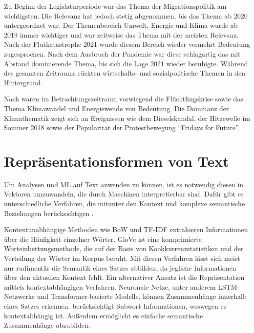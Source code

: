 Zu Beginn der Legislaturperiode war das Thema der Migrationspolitik am wichtigsten. Die Relevanz hat jedoch stetig abgenommen, bis das Thema ab \num{2020} untergeordnet war. Der Themenbereich Umwelt, Energie und Klima wurde ab \num{2019} immer wichtiger und war zeitweise das Thema mit der meisten Relevanz. Nach der Flutkatastrophe \num{2021} wurde diesem Bereich wieder vermehrt Bedeutung zugesprochen. Nach dem Ausbruch der Pandemie war diese schlagartig das mit Abstand dominierende Thema, bis sich die Lage \num{2021} wieder beruhigte. Während des gesamten Zeitraums rückten wirtschafts- und sozialpolitische Themen in den Hintergrund.

Nach \textcite{niedermayer_entwicklung_2020} waren im Betrachtungszeitraum vorwiegend die Flüchtlingskrise sowie das Thema Klimawandel und Energiewende von Bedeutung. Die Dominanz der Klimathematik zeigt sich an Ereignissen wie dem Dieselskandal, der Hitzewelle im Sommer \num{2018} sowie der Popularität der Protestbewegung \enquote{Fridays for Future}.

\section{Repräsentationsformen von Text} \label{sec:representationForms}


Um Analysen und \ac{ML} auf Text anwenden zu können, ist es notwendig diesen in Vektoren umzuwandeln, die durch Maschinen interpretierbar sind. Dafür gibt es unterschiedliche Verfahren, die mitunter den Kontext und komplexe semantische Beziehungen berücksichtigen \autocite{kowsari_text_2019, jurafsky_speech_2023}.

Kontextunabhängige Methoden wie \ac{BoW} und \ac{TF-IDF} extrahieren Informationen über die Häufigkeit einzelner Wörter. \ac{GloVe} ist eine komprimierte Worteinbettungsmethode, die auf der Basis von Kookkurrenzstatistiken und der Verteilung der Wörter im Korpus beruht. Mit diesen Verfahren lässt sich meist nur rudimentär die Semantik eines Satzes abbilden, da jegliche Informationen über den aktuellen Kontext fehlt. Ein alternativer Ansatz ist die Repräsentation mittels kontextabhängigen Verfahren. Neuronale Netze, unter anderem \ac{LSTM}-Netzwerke und Transformer-basierte Modelle, können Zusammenhänge innerhalb eines Satzes erkennen. \ft berücksichtigt Subwort-Informationen, weswegen es kontextabhängig ist. Außerdem ermöglicht es einfache semantische Zusammenhänge abzubilden.

